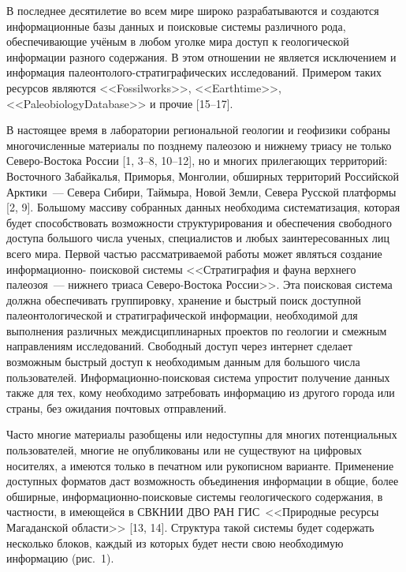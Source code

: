  

\makeProcTitle
{}

В последнее десятилетие во всем мире широко разрабатываются и создаются информационные базы данных и поисковые системы различного рода, обеспечивающие учёным в любом уголке мира доступ к геологической информации разного содержания. В этом отношении не является исключением и информация палеонтолого-стратиграфических исследований. Примером таких ресурсов являются <<Fossilworks>>, <<Earthtime>>, <<PaleobiologyDatabase>> и прочие [15--17].

В настоящее время в лаборатории региональной геологии и геофизики собраны многочисленные материалы по позднему палеозою и нижнему триасу не только Северо-Востока России [1, 3--8, 10--12], но и многих прилегающих территорий: Восточного Забайкалья, Приморья, Монголии, обширных территорий Российской Арктики~--- Севера Сибири, Таймыра, Новой Земли, Севера Русской платформы [2, 9]. Большому массиву собранных данных необходима систематизация, которая будет способствовать возможности структурирования и обеспечения свободного доступа большого числа ученых, специалистов и любых заинтересованных лиц всего мира.
Первой частью рассматриваемой работы может являться создание информационно-  поисковой системы <<Стратиграфия и фауна верхнего палеозоя~--- нижнего триаса Северо-Востока России>>. Эта поисковая система должна обеспечивать группировку, хранение и быстрый поиск доступной палеонтологической и стратиграфической информации, необходимой для выполнения различных междисциплинарных проектов по геологии и смежным направлениям исследований. Свободный доступ через интернет сделает возможным быстрый доступ к необходимым данным для большого числа пользователей. Информационно-поисковая система упростит получение данных также для тех, кому необходимо затребовать информацию из другого города или страны, без ожидания почтовых отправлений.

Часто многие материалы разобщены или недоступны для многих потенциальных пользователей, многие не опубликованы или не существуют на цифровых носителях, а имеются только в печатном или рукописном варианте. Применение доступных форматов даст возможность объединения информации в общие, более обширные, информационно-поисковые системы геологического содержания, в частности, в имеющейся в СВКНИИ ДВО РАН ГИС~<<Природные ресурсы Магаданской области>> [13, 14].
Структура такой системы будет содержать несколько блоков, каждый из которых будет нести свою необходимую информацию (рис.~1).

